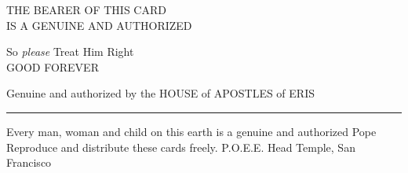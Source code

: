 \documentclass[9pt,a4paper]{memoir}
\begin{document}
\noindent

\begin{minipage}[c]{0.9\linewidth}
	\begin{center}
		THE BEARER OF THIS CARD\\
		IS A GENUINE AND AUTHORIZED
	\end{center}
\end{minipage}

\hspace{1.0cm}

\begin{minipage}[c]{0.9\linewidth}
	\begin{center}
		\Huge{}
	\end{center}
\end{minipage}

\hspace{1.0cm}

\begin{minipage}[c]{0.9\linewidth}
\begin{center}
	So \textit{please} Treat Him Right\\
	GOOD FOREVER
\end{center}
\end{minipage}

\hspace{1.0mm}

\begin{minipage}[c]{0.9\linewidth}
	\begin{center}
		\tiny{Genuine and authorized by the HOUSE of APOSTLES of ERIS}
		\par\noindent\rule{\textwidth}{0.4pt}
		\tiny{Every man, woman and child on this earth is a genuine and authorized Pope}\\
		\tiny{Reproduce and distribute these cards freely. P.O.E.E. Head Temple, San Francisco}
	\end{center}
\end{minipage}
\end{document}
